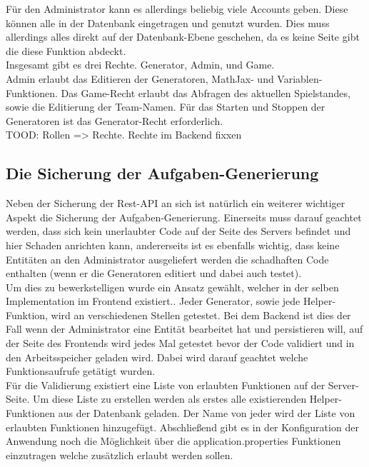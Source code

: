 Für den Administrator kann es allerdings beliebig viele Accounts geben. Diese können alle in der Datenbank eingetragen und genutzt wurden. Dies muss allerdings alles direkt auf der Datenbank-Ebene geschehen, da es keine Seite gibt die diese Funktion abdeckt. \\

Insgesamt gibt es drei Rechte. Generator, Admin, und Game. \\

Admin erlaubt das Editieren der Generatoren, MathJax- und Variablen-Funktionen. Das Game-Recht erlaubt das Abfragen des aktuellen Spielstandes, sowie die Editierung der Team-Namen. Für das Starten und Stoppen der Generatoren ist das Generator-Recht erforderlich. \\

TOOD: Rollen => Rechte. Rechte im Backend fixxen

\subsection{Die Sicherung der Aufgaben-Generierung}\label{GenerateTaskChapter}

Neben der Sicherung der Rest-API an sich ist natürlich ein weiterer wichtiger Aspekt die Sicherung der Aufgaben-Generierung. Einerseits muss darauf geachtet werden, dass sich kein unerlaubter Code auf der Seite des Servers befindet und hier Schaden anrichten kann, andererseits ist es ebenfalls wichtig, dass keine Entitäten an den Administrator ausgeliefert werden die schadhaften Code enthalten (wenn er die Generatoren editiert und dabei auch testet). \\

Um dies zu bewerkstelligen wurde ein Ansatz gewählt, welcher in der selben Implementation im Frontend existiert.. Jeder Generator, sowie jede Helper-Funktion, wird an verschiedenen Stellen getestet. Bei dem Backend ist dies der Fall wenn der Administrator eine Entität bearbeitet hat und persistieren will, auf der Seite des Frontends wird jedes Mal getestet bevor der Code validiert und in den Arbeitsspeicher geladen wird. Dabei wird darauf geachtet welche Funktionsaufrufe getätigt wurden. \\

Für die Validierung existiert eine Liste von erlaubten Funktionen auf der Server-Seite. Um diese Liste zu erstellen werden als erstes alle existierenden Helper-Funktionen aus der Datenbank geladen. Der Name von jeder wird der Liste von erlaubten Funktionen hinzugefügt. Abschließend gibt es in der Konfiguration der Anwendung noch die Möglichkeit über die application.properties Funktionen einzutragen welche zusätzlich erlaubt werden sollen. \\

